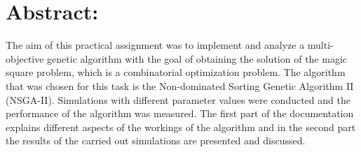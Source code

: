 %
%

\section*{Abstract:}

The aim of this practical assignment was to implement and analyze a multi-objective genetic algorithm with the goal of obtaining the solution of the magic square problem, which is a combinatorial optimization problem. The algorithm that was chosen for this task is the Non-dominated Sorting Genetic Algorithm II (NSGA-II). Simulations with different parameter values were conducted and the performance of the algorithm was measured. The first part of the documentation explains different aspects of the workings of the algorithm and in the second part the results of the carried out simulations are presented and discussed.
